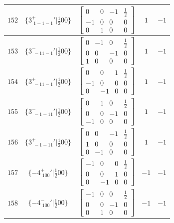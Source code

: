 \documentclass[fleqn,8pt]{jsarticle}
\begin{document}
\begin{longtable}{ccccc}
$ 152 $ & $ \{3^{+}_{\,\,1-1-1}{}'|\frac{1}{2} 0 0\} $ & $ \begin{bmatrix} 0 & 0 & -1 & \frac{1}{2} \\ -1 & 0 & 0 & 0 \\ 0 & 1 & 0 & 0 \end{bmatrix} $ & $ 1 $ & $ -1 $ \\ \hline
$ 153 $ & $ \{3^{-}_{\,\,-11-1}{}'|\frac{1}{2} 0 0\} $ & $ \begin{bmatrix} 0 & -1 & 0 & \frac{1}{2} \\ 0 & 0 & -1 & 0 \\ 1 & 0 & 0 & 0 \end{bmatrix} $ & $ 1 $ & $ -1 $ \\ \hline
$ 154 $ & $ \{3^{+}_{\,\,-11-1}{}'|\frac{1}{2} 0 0\} $ & $ \begin{bmatrix} 0 & 0 & 1 & \frac{1}{2} \\ -1 & 0 & 0 & 0 \\ 0 & -1 & 0 & 0 \end{bmatrix} $ & $ 1 $ & $ -1 $ \\ \hline
$ 155 $ & $ \{3^{-}_{\,\,-1-11}{}'|\frac{1}{2} 0 0\} $ & $ \begin{bmatrix} 0 & 1 & 0 & \frac{1}{2} \\ 0 & 0 & -1 & 0 \\ -1 & 0 & 0 & 0 \end{bmatrix} $ & $ 1 $ & $ -1 $ \\ \hline
$ 156 $ & $ \{3^{+}_{\,\,-1-11}{}'|\frac{1}{2} 0 0\} $ & $ \begin{bmatrix} 0 & 0 & -1 & \frac{1}{2} \\ 1 & 0 & 0 & 0 \\ 0 & -1 & 0 & 0 \end{bmatrix} $ & $ 1 $ & $ -1 $ \\ \hline
$ 157 $ & $ \{-4^{+}_{\,\,100}{}'|\frac{1}{2} 0 0\} $ & $ \begin{bmatrix} -1 & 0 & 0 & \frac{1}{2} \\ 0 & 0 & 1 & 0 \\ 0 & -1 & 0 & 0 \end{bmatrix} $ & $ -1 $ & $ -1 $ \\ \hline
$ 158 $ & $ \{-4^{-}_{\,\,100}{}'|\frac{1}{2} 0 0\} $ & $ \begin{bmatrix} -1 & 0 & 0 & \frac{1}{2} \\ 0 & 0 & -1 & 0 \\ 0 & 1 & 0 & 0 \end{bmatrix} $ & $ -1 $ & $ -1 $ \\ \hline

\end{longtable}
\end{document}
